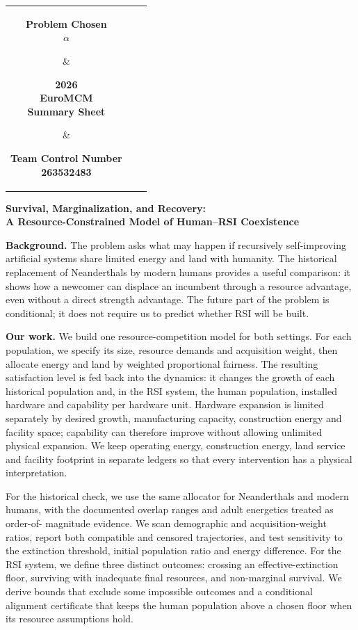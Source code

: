 \documentclass[12pt,a4paper]{article}
\theoremstyle{remark}
\newcommand{\TeamNumber}{263532483} %
\newcommand{\PaperTitle}{Survival, Marginalization, and Recovery:\\A Resource-Constrained Model of Human--RSI Coexistence}
\begin{document}
\thispagestyle{fancy}
\vspace*{0pt}
\begin{center}
\begin{tabular}{ccc}
\parbox[t]{0.29\linewidth}{\centering\bfseries Problem Chosen\\[3pt]\Large\textcolor{EuroBlue}{$\alpha$}} &
\parbox[t]{0.29\linewidth}{\centering\bfseries 2026\\EuroMCM\\Summary Sheet} &
\parbox[t]{0.29\linewidth}{\centering\bfseries Team Control Number\\[3pt]\Large\textcolor{EuroBlue}{\TeamNumber}}\\[6pt]
\hline
\end{tabular}
\end{center}
\begin{center}{\large\bfseries \PaperTitle}\end{center}

\textbf{Background.} The problem asks what may happen if recursively
self-improving artificial systems share limited energy and land with humanity.
The historical replacement of Neanderthals by modern humans provides a useful
comparison: it shows how a newcomer can displace an incumbent through a resource
advantage, even without a direct strength advantage. The future part of the problem
is conditional; it does not require us to predict whether RSI will be built.

\textbf{Our work.} We build one resource-competition model for both settings.
For each population, we specify its size, resource demands and acquisition weight,
then allocate energy and land by weighted proportional fairness. The resulting
satisfaction level is fed back into the dynamics: it changes the growth of each
historical population and, in the RSI system, the human population, installed
hardware and capability per hardware unit. Hardware expansion is limited separately
by desired growth, manufacturing capacity, construction energy and facility space;
capability can therefore improve without allowing unlimited physical expansion.
We keep operating energy, construction energy, land service and facility footprint
in separate ledgers so that every intervention has a physical interpretation.

For the historical check, we use the same allocator for Neanderthals and modern
humans, with the documented overlap ranges and adult energetics treated as order-of-
magnitude evidence. We scan demographic and acquisition-weight ratios, report both
compatible and censored trajectories, and test sensitivity to the extinction
threshold, initial population ratio and energy difference. For the RSI system, we
define three distinct outcomes: crossing an effective-extinction floor, surviving
with inadequate final resources, and non-marginal survival. We derive bounds that
exclude some impossible outcomes and a conditional alignment certificate that keeps
the human population above a chosen floor when its resource assumptions hold.
\end{document}
